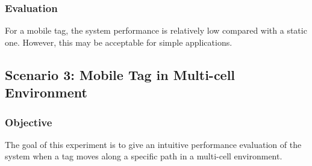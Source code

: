 \documentclass[\main/thesis.tex]{subfiles}
\begin{document}
\subsubsection{Evaluation}

For a mobile tag, the system performance is relatively low compared with a static one. However, this may be acceptable for simple applications.


\subsection{Scenario 3: Mobile Tag in Multi-cell Environment}

\subsubsection{Objective}
The goal of this experiment is to give an intuitive performance evaluation of the system when a tag moves along a specific path in a multi-cell environment.
\end{document}
